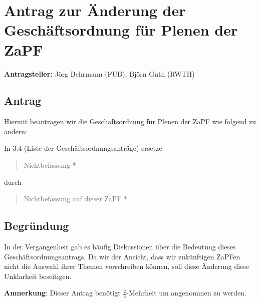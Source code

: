 \documentclass[draft,10pt,oneside]{scrartcl}
\begin{document}
\section*{Antrag zur Änderung der Geschäftsordnung für Plenen der ZaPF}

\textbf{Antragsteller:} Jörg Behrmann (FUB), Björn Guth (RWTH)

\subsection*{Antrag}

Hiermit beantragen wir die Geschäftsordnung für Plenen der ZaPF wie folgend zu
ändern:

In 3.4 (Liste der Geschäftsordnungsanträge) ersetze
\begin{quote}
	Nichtbefassung *
\end{quote}
durch
\begin{quote}
	Nichtbefassung auf dieser ZaPF *
\end{quote}

\subsection*{Begründung}
In der Vergangenheit gab es häufig Diskussionen über die Bedeutung dieses
Geschäftsordnungsantrags. Da wir der Ansicht, dass wir zukünftigen ZaPFen nicht
die Auswahl ihrer Themen vorschreiben können, soll diese Änderung diese
Unklarheit beseitigen.

\textbf{Anmerkung}: Dieser Antrag benötigt $\frac{2}{3}$-Mehrheit um
angenommen zu werden.
\end{document}
